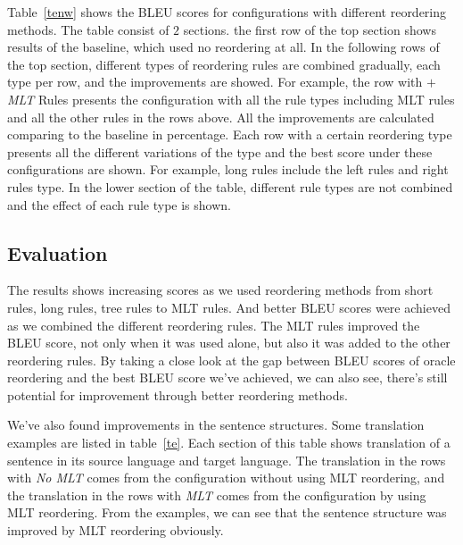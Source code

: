 Table~\ref{tenw} shows the BLEU scores for configurations with different reordering methods. The table consist of $2$ sections. the first row of the top section shows results of the baseline, which used no reordering at all. In the following rows of the top section, different types of reordering rules are combined gradually, each type per row, and the improvements are showed. For example, the row with \emph{$+$MLT} Rules presents the configuration with all the rule types including MLT rules and all the other rules in the rows above. All the improvements are calculated comparing to the baseline in percentage. Each row with a certain reordering type presents all the different variations of the type and the best score under these configurations are shown. For example, long rules include the left rules and right rules type. In the lower section of the table, different rule types are not combined and the effect of each rule type is shown. %

\subsection{Evaluation}

The results shows increasing scores as we used reordering methods from short rules, long rules, tree rules to MLT rules. And better BLEU scores were achieved as we combined the different reordering rules. The MLT rules improved the BLEU score, not only when it was used alone, but also it was added to the other reordering rules. 
By taking a close look at the gap between BLEU scores of oracle reordering and the best BLEU score we've achieved, we can also see, there's still potential for improvement through better reordering methods.

We've also found improvements in the sentence structures. Some translation examples are listed in table~\ref{te}. Each section of this table shows translation of a sentence in its source language and target language. The translation in the rows with \emph{No MLT} comes from the configuration without using MLT reordering, and the translation in the rows with \emph{MLT} comes from the configuration by using MLT reordering. From the examples, we can see that the sentence structure was improved by MLT reordering obviously.

